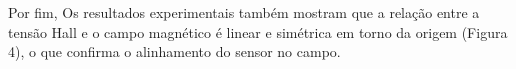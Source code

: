 \documentclass[10pt,twocolumn,letterpaper]{article}
\begin{document}
\hspace{1cm} Por fim, Os resultados experimentais também mostram que a relação entre a tensão Hall e o campo magnético é linear e simétrica em torno da origem (Figura 4), o que confirma o alinhamento do sensor no campo.









\end{document}
